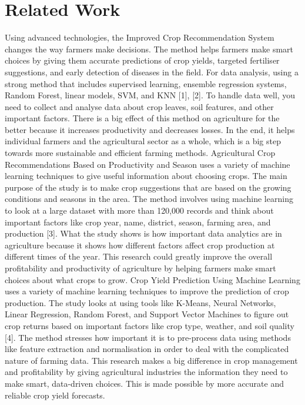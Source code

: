 \section{Related Work}
Using advanced technologies, the Improved Crop Recommendation System changes the way farmers make decisions. The method helps farmers make smart choices by giving them accurate predictions of crop yields, targeted fertiliser suggestions, and early detection of diseases in the field. For data analysis, using a strong method that includes supervised learning, ensemble regression systems, Random Forest, linear models, SVM, and KNN [1], [2]. To handle data well, you need to collect and analyse data about crop leaves, soil features, and other important factors. There is a big effect of this method on agriculture for the better because it increases productivity and decreases losses. In the end, it helps individual farmers and the agricultural sector as a whole, which is a big step towards more sustainable and efficient farming methods. Agricultural Crop Recommendations Based on Productivity and Season uses a variety of machine learning techniques to give useful information about choosing crops. The main purpose of the study is to make crop suggestions that are based on the growing conditions and seasons in the area. The method involves using machine learning to look at a large dataset with more than 120,000 records and think about important factors like crop year, name, district, season, farming area, and production [3]. What the study shows is how important data analytics are in agriculture because it shows how different factors affect crop production at different times of the year. This research could greatly improve the overall profitability and productivity of agriculture by helping farmers make smart choices about what crops to grow. Crop Yield Prediction Using Machine Learning uses a variety of machine learning techniques to improve the prediction of crop production. The study looks at using tools like K-Means, Neural Networks, Linear Regression, Random Forest, and Support Vector Machines to figure out crop returns based on important factors like crop type, weather, and soil quality [4]. The method stresses how important it is to pre-process data using methods like feature extraction and normalisation in order to deal with the complicated nature of farming data. This research makes a big difference in crop management and profitability by giving agricultural industries the information they need to make smart, data-driven choices. This is made possible by more accurate and reliable crop yield forecasts.











